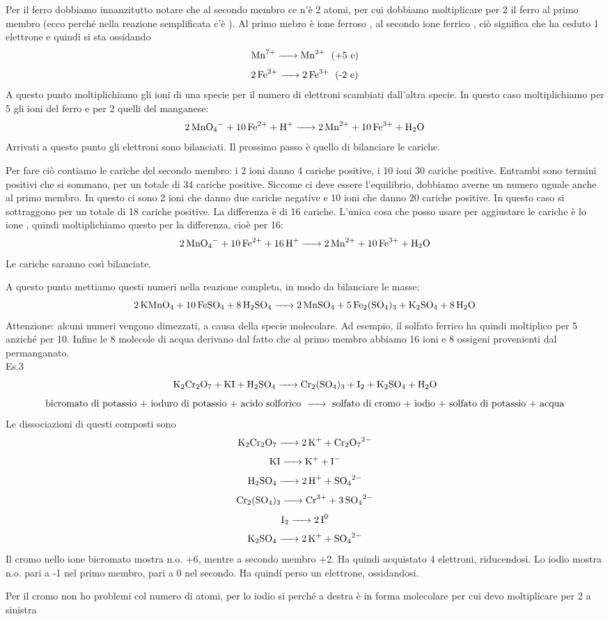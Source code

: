 Per il ferro dobbiamo innanzitutto notare che al secondo membro ce n'è 2 atomi, per cui dobbiamo moltiplicare per 2 il ferro al primo membro (ecco perché nella reazione semplificata c'è ). Al primo mebro è ione ferroso , al secondo ione ferrico , ciò significa che ha ceduto 1 elettrone e quindi si sta ossidando
$$\ce{Mn^7+ -> Mn^2+ \; \text{(+5 e)}}$$
$$\ce{2Fe^2+ -> 2Fe^3+ \; \text{(-2 e)}}$$
A questo punto moltiplichiamo gli ioni di una specie per il numero di elettroni scambiati dall'altra specie. In questo caso moltiplichiamo per 5 gli ioni del ferro e per 2 quelli del manganese:
$$\ce{2MnO_4- + 10Fe^2+ + H+ -> 2Mn^2+ + 10Fe^3+ + H_2O}$$
Arrivati a questo punto gli elettroni sono bilanciati. Il prossimo passo è quello di bilanciare le cariche.

Per fare ciò contiamo le cariche del secondo membro: i 2 ioni  danno 4 cariche positive, i 10 ioni  30 cariche positive. Entrambi sono termini positivi che si sommano, per un totale di 34 cariche positive. Siccome ci deve essere l'equilibrio, dobbiamo averne un numero uguale anche al primo membro. In questo ci sono 2 ioni  che danno due cariche negative e 10 ioni  che danno 20 cariche positive. In questo caso si sottraggono per un totale di 18 cariche positive. La differenza è di 16 cariche. L'unica cosa che posso usare per aggiustare le cariche è lo ione , quindi moltiplichiamo questo per la differenza, cioè per 16:
$$\ce{2MnO_4- + 10Fe^2+ + 16H+ -> 2Mn^2+ + 10Fe^3+ + H_2O}$$
Le cariche saranno così bilanciate.

A questo punto mettiamo questi numeri nella reazione completa, in modo da bilanciare le masse:
$$\ce{2KMnO_4 + 10FeSO_4 + 8H_2SO_4 -> 2MnSO_4 + 5Fe_2(SO_4)_3 + K_2SO_4 + 8H_2O}$$
Attenzione: alcuni numeri vengono dimezzati, a causa della specie molecolare. Ad esempio, il solfato ferrico ha  quindi moltiplico per 5 anziché per 10. Infine le 8 molecole di acqua derivano dal fatto che al primo membro abbiamo 16 ioni  e 8 ossigeni provenienti dal permanganato.\\
Es.3
$$\ce{K_2Cr_2O_7 + KI + H_2SO_4 -> Cr_2(SO_4)_3 + I_2 + K_2SO_4 + H_2O}$$
$$\text{bicromato di potassio + ioduro di potassio + acido solforico \ce{->} solfato di cromo +  iodio + solfato di potassio + acqua}$$
Le dissociazioni di questi composti sono
$$\ce{K_2Cr_2O_7 -> 2K^+ + Cr_2O_7^2-}$$ 
$$\ce{KI -> K+ + I-}$$
$$\ce{H_2SO_4 -> 2H+ + SO_4^2-}$$
$$\ce{Cr_2(SO_4)_3 -> Cr^3+ + 3SO_4^2-}$$
$$\ce{I_2 -> 2I^0}$$
$$\ce{K_2SO_4 -> 2K+ + SO_4^2-}$$
Il cromo nello ione bicromato mostra n.o. +6, mentre a secondo membro +2. Ha quindi acquistato 4 elettroni, riducendosi.
Lo iodio mostra n.o. pari a -1 nel primo membro, pari a 0 nel secondo. Ha quindi perso un elettrone, ossidandosi. 

Per il cromo non ho problemi col numero di atomi, per lo iodio si perché a destra è in forma molecolare  per cui devo moltiplicare per 2 a sinistra 